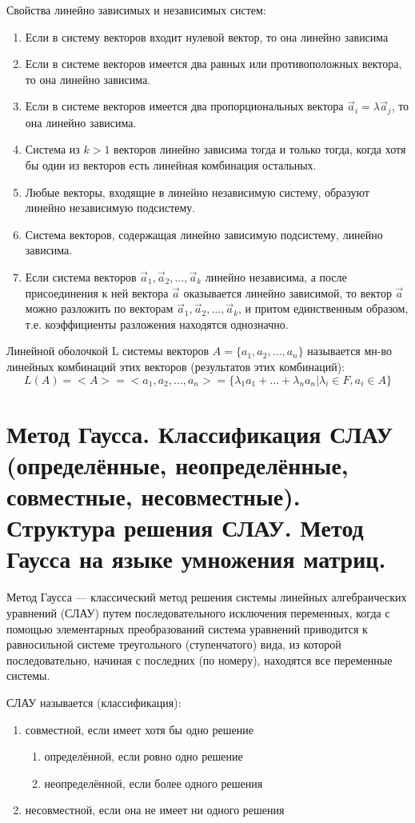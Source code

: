 \documentclass{article}
\begin{document}
Свойства линейно зависимых и независимых систем:
\begin{enumerate}
    \item Если в систему векторов входит нулевой вектор, то она линейно зависима
    \item Если в системе векторов имеется два равных или противоположных вектора, то она линейно зависима.
    \item Если в системе векторов имеется два пропорциональных вектора $\vec{a}_i=\lambda\vec{a}_j$, то она линейно зависима.
    \item Система из $k>1$ векторов линейно зависима тогда и только тогда, когда хотя бы один из векторов есть линейная комбинация остальных.
    \item Любые векторы, входящие в линейно независимую систему, образуют линейно независимую подсистему.
    \item Система векторов, содержащая линейно зависимую подсистему, линейно зависима.
    \item Если система векторов $\vec{a}_1,\vec{a}_2, \ldots, \vec{a}_k$ линейно независима, а после присоединения к ней вектора $\vec{a}$ оказывается линейно зависимой, то вектор $\vec{a}$ можно разложить по векторам $\vec{a}_1,\vec{a}_2,\ldots,\vec{a}_k$, и притом единственным образом, т.е. коэффициенты разложения находятся однозначно.
\end{enumerate}

\textsf{Линейной оболочкой L} системы векторов $A = \{a_1,a_2,\dots,a_n\}$ называется мн-во линейных комбинаций этих векторов (результатов этих комбинаций):
$$L(A)=<A>=<a_1,a_2,\dots,a_n>=\{\lambda_1a_1+\dots+\lambda_na_n | \lambda_i\in F, a_i\in A\}$$

\section{Метод Гаусса. Классификация СЛАУ (определённые, неопределённые, совместные, несовместные). Структура решения СЛАУ. Метод Гаусса на языке умножения матриц.}

\textsf{Метод Гаусса} — классический метод решения системы линейных алгебраических уравнений (СЛАУ) путем последовательного исключения переменных, когда с помощью элементарных преобразований система уравнений приводится к равносильной системе треугольного (ступенчатого) вида, из которой последовательно, начиная с последних (по номеру), находятся все переменные системы.

СЛАУ называется (классификация):
\begin{enumerate}
    \item совместной, если имеет хотя бы одно решение
    \begin{enumerate}
        \item определённой, если ровно одно решение
        \item неопределённой, если более одного решения
    \end{enumerate}
    \item несовместной, если она не имеет ни одного решения
\end{enumerate}
\end{document}
